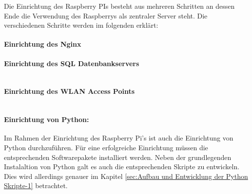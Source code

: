 Die Einrichtung des Raspberry PIs besteht aus mehreren Schritten an dessen Ende die Verwendung des Raspberrys als zentraler Server steht. Die verschiedenen Schritte werden im folgenden erklärt: 
\paragraph{Einrichtung des Nginx}  
\label{sec:Einrichtung des Nginx-1} 

\paragraph{Einrichtung des SQL Datenbankservers}$\;$ \\
\label{sec:Einrichtung des SQL Datenbankservers-1} 

\paragraph{Einrichtung des WLAN Access Points}$\;$ \\ 
\label{sec:Einrichtung des WLAN Access Points-1} 

\paragraph{Einrichtung von Python:}$\;$ \\
\label{sec:Python Skripte-1} 
Im Rahmen der Einrichtung des Raspberry Pi's ist auch die Einrichtung von Python durchzuführen. Für eine erfolgreiche Einrichtung müssen die entsprechenden Softwarepakete installiert werden.  Neben der grundlegenden Instalaltion von Python galt es auch die entsprechenden Skripte zu entwickeln. Dies wird allerdings genauer im Kapitel \ref{sec:Aufbau und Entwicklung der Python Skripte-1} betrachtet. 
